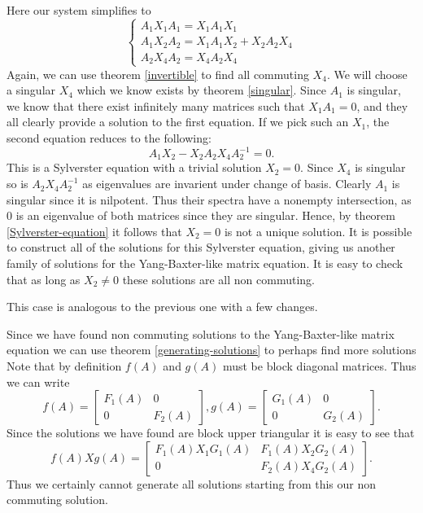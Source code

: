 \documentclass{article}
\begin{document}
\begin{algorithm}
  \begin{case}[$X_3 = 0, X_2 \neq 0$]
    Here our system simplifies to
    \[\begin{cases}
      A_1 X_1 A_1 = X_1 A_1 X_1\\
      A_1 X_2 A_2 = X_1 A_1 X_2 + X_2 A_2 X_4\\
      A_2 X_4 A_2 = X_4 A_2 X_4
    \end{cases}\]
    Again, we can use theorem \ref{invertible} to find all commuting $X_4$.
    We will choose a singular $X_4$ which we know exists by theorem \ref{singular}.
    Since $A_1$ is singular, we know that there exist infinitely many matrices such that $X_1 A_1 = 0$, and they all clearly provide a solution to the first equation.
    If we pick such an $X_1$, the second equation reduces to the following:
    \[A_1 X_2 - X_2 A_2 X_4 A_2^{-1} = 0.\]
    This is a Sylverster equation with a trivial solution $X_2 = 0$.
    Since $X_4$ is singular so is $A_2 X_4 A_2^{-1}$ as eigenvalues are invarient under change of basis.
    Clearly $A_1$ is singular since it is nilpotent.
    Thus their spectra have a nonempty intersection, as $0$ is an eigenvalue of both matrices since they are singular.
    Hence, by theorem \ref{Sylverster-equation} it follows that $X_2 = 0$ is not a unique solution.
    It is possible to construct all of the solutions for this Sylverster equation, giving us another family of solutions for the Yang-Baxter-like matrix equation.
    It is easy to check that as long as $X_2 \neq 0$ these solutions are all non commuting.
  \end{case}

  \begin{case}[$X_2 = 0, X_3 \neq 0$]
    This case is analogous to the previous one with a few changes.
  \end{case}

  Since we have found non commuting solutions to the Yang-Baxter-like matrix equation we can use theorem \ref{generating-solutions} to perhaps find more solutions
  Note that by definition $f(A)$ and $g(A)$ must be block diagonal matrices.
  Thus we can write
  \[f(A) = \begin{bmatrix} F_1 (A) & 0\\ 0 & F_2 (A) \end{bmatrix}, g(A) = \begin{bmatrix} G_1 (A) & 0\\ 0 & G_2 (A) \end{bmatrix}.\]
  Since the solutions we have found are block upper triangular it is easy to see that
  \[f(A) X g(A) = \begin{bmatrix} F_1 (A) X_1 G_1 (A) & F_1 (A) X_2 G_2 (A)\\ 0 & F_2 (A) X_4 G_2 (A) \end{bmatrix}.\]
  Thus we certainly cannot generate all solutions starting from this our non commuting solution.


\end{algorithm}
\end{document}
